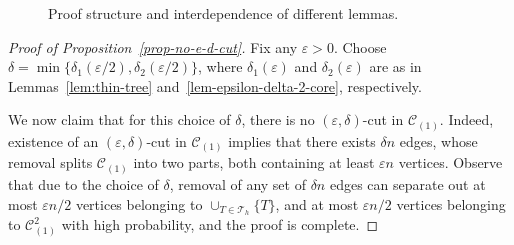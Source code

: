 \documentclass[11pt,a4paper, reqno]{article}
\numberwithin{equation}{section}
\numberwithin{equation}{section}
\def\sss{\scriptscriptstyle}
\newcommand{\1}{\ensuremath{\mathbbm{1}}}
\numberwithin{equation}{section}
\numberwithin{theorem}{section}
\begin{document}
\begin{figure}
\begin{figure}[omitted: a diagram of this paper's results, not reproduced here]\end{figure}
\caption{Proof structure and interdependence of different lemmas.}
\label{fig:structure}
\end{figure}


\begin{proof}[Proof of Proposition~\ref{prop-no-e-d-cut}]
Fix any $\varepsilon>0$.
Choose $\delta = \min\{\delta_1(\varepsilon/2), \delta_2(\varepsilon/2)\}$, where $\delta_1(\varepsilon)$ and $\delta_2(\varepsilon)$ are as in Lemmas~\ref{lem:thin-tree} and~\ref{lem-epsilon-delta-2-core}, respectively.

We now claim that for this choice of $\delta$, there is no $(\varepsilon,\delta)$-cut in $\mathscr{C}_{\sss (1)}$.
Indeed, existence of an $(\varepsilon,\delta)$-cut in $\mathscr{C}_{\sss (1)}$ implies that there exists $\delta n$ edges, whose removal splits $\mathscr{C}_{\sss (1)}$ into two parts, both containing at least $\varepsilon n$ vertices.
Observe that due to the choice of $\delta$, removal of any set of $\delta n$
edges can separate out at most $\varepsilon n/2$ vertices belonging to $\cup_{T\in\mathcal{T}_h}\{T\}$, and at most $\varepsilon n/2$ vertices belonging to $\mathscr{C}_{\sss (1)}^2 $  with high probability, and the proof is complete.
\end{proof}
 
 
\end{document}
